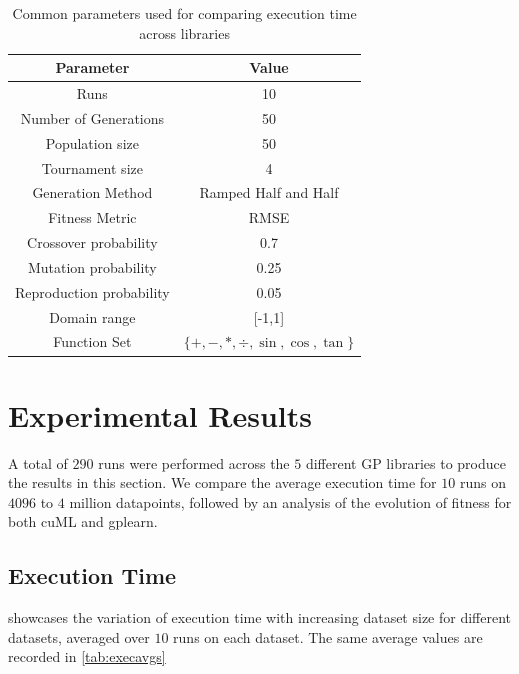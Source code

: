 \begin{table}[htbp]
  \caption{Common parameters used for comparing execution time across libraries}
  \begin{center}
    \begin{tabular}[c]{cc}
      \toprule
      \textbf{Parameter} & \textbf{Value} \\
      \midrule
      Runs                      & 10      \\
      Number of Generations     & 50      \\
      Population size           & 50      \\
      Tournament size           & 4       \\ 
      Generation Method         & Ramped Half and Half \\
      Fitness Metric            & RMSE    \\
      Crossover probability     & 0.7     \\
      Mutation probability      & 0.25    \\
      Reproduction probability  & 0.05    \\
      Domain range              & [-1,1]  \\
      Function Set              & $\{+,-,*,\div,\sin ,\cos,\tan\}$ \\
      \bottomrule
    \end{tabular}
    \label{tab:params}
  \end{center}
\end{table}

\section{Experimental Results}
\label{sec:results}
A total of $290$ runs were performed across the $5$ different GP libraries to produce the results in this section. We compare the average execution time for $10$ runs on $4096$ to $4$ million datapoints, followed by an analysis of the evolution of fitness for both cuML and gplearn.

\subsection{Execution Time}
\label{subsec:exectimes}
 showcases the variation of execution time with increasing dataset size for different datasets, averaged over $10$ runs on each dataset. The same average values are recorded in \cref{tab:execavgs}

